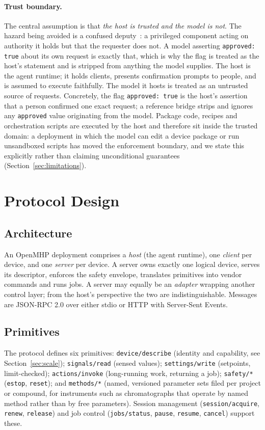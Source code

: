 \documentclass[11pt]{article}
\begin{document}
\paragraph{Trust boundary.} The central assumption is that \emph{the host is trusted and the
model is not}. The hazard being avoided is a confused deputy~\cite{hardy1988}: a privileged component acting on authority it holds but that the requester does not. A model asserting \texttt{approved: true} about its own request is exactly that, which is why the flag is treated as the host's statement and is stripped from anything the model supplies. The host is the agent runtime; it holds clients, presents confirmation prompts
to people, and is assumed to execute faithfully. The model it hosts is treated as an
untrusted source of requests. Concretely, the flag \texttt{approved:\ true} is the host's
assertion that a person confirmed one exact request; a reference bridge strips and ignores any
\texttt{approved} value originating from the model. Package code, recipes and orchestration
scripts are executed by the host and therefore sit inside the trusted domain: a deployment in
which the model can edit a device package or run unsandboxed scripts has moved the enforcement
boundary, and we state this explicitly rather than claiming unconditional guarantees
(Section~\ref{sec:limitations}).

\section{Protocol Design}
\label{sec:protocol}

\subsection{Architecture}
An OpenMHP deployment comprises a \emph{host} (the agent runtime), one \emph{client} per
device, and one \emph{server} per device. A server owns exactly one logical device, serves its
descriptor, enforces the safety envelope, translates primitives into vendor commands and runs
jobs. A server may equally be an \emph{adapter} wrapping another control layer; from the
host's perspective the two are indistinguishable. Messages are JSON-RPC 2.0 over either stdio
or HTTP with Server-Sent Events.

\subsection{Primitives}
The protocol defines six primitives:
\texttt{device/describe} (identity and capability, see Section~\ref{sec:scale});
\texttt{signals/read} (sensed values);
\texttt{settings/write} (setpoints, limit-checked);
\texttt{actions/invoke} (long-running work, returning a job);
\texttt{safety/*} (\texttt{estop}, \texttt{reset});
and \texttt{methods/*} (named, versioned parameter sets filed per project or compound, for
instruments such as chromatographs that operate by named method rather than by free
parameters). Session management (\texttt{session/acquire}, \texttt{renew}, \texttt{release})
and job control (\texttt{jobs/status}, \texttt{pause}, \texttt{resume}, \texttt{cancel})
support these.
\end{document}
